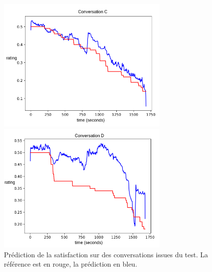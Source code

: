 \begin{figure}[thb]
  \centering
    \begin{minipage}[b]{0.49\linewidth}
        \center
        \centerline{\includegraphics[width=8.4cm]{./Chapitre5/figures/test_ok.png}}
    \end{minipage}
    \begin{minipage}[b]{0.49\linewidth}
        \center
        \centerline{\includegraphics[width=8.4cm]{./Chapitre5/figures/test_not_ok.png}}
    \end{minipage}
    \caption{Prédiction de la satisfaction sur des conversations issues du test. La référence est en rouge, la prédiction en bleu.}
    \label{fig:result7minutes}
\end{figure}
